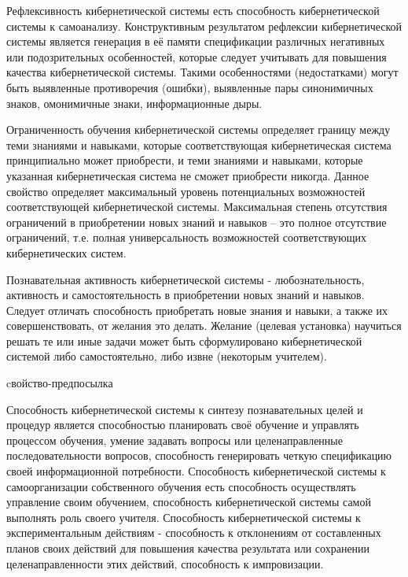 Рефлексивность кибернетической системы есть способность кибернетической системы к самоанализу.
Конструктивным результатом рефлексии кибернетической системы является генерация в её памяти спецификации различных негативных или подозрительных особенностей, которые следует учитывать для повышения качества кибернетической системы.
Такими особенностями (недостатками) могут быть выявленные противоречия (ошибки), выявленные пары синонимичных знаков, омонимичные знаки, информационные дыры.

Ограниченность обучения кибернетической системы определяет границу между теми знаниями и навыками, которые соответствующая кибернетическая система принципиально может приобрести, и теми знаниями и навыками, которые указанная кибернетическая система не сможет приобрести никогда.
Данное свойство определяет максимальный уровень потенциальных возможностей соответствующей кибернетической системы.
Максимальная степень отсутствия ограничений в приобретении новых знаний и навыков – это полное отсутствие ограничений, т.е. полная универсальность возможностей соответствующих кибернетических систем.

Познавательная активность кибернетической системы - любознательность, активность и самостоятельность в приобретении новых знаний и навыков.
Следует отличать способность приобретать новые знания и навыки, а также их совершенствовать, от желания это делать.
Желание (целевая установка) научиться решать те или иные задачи может быть сформулировано кибернетической системой либо самостоятельно, либо извне (некоторым учителем).

\begin{SCn}
\begin{scnrelfromlist}{cвойство-предпосылка}
\end{scnrelfromlist}
\end{SCn}

Способность кибернетической системы к синтезу познавательных целей и процедур является способностью планировать своё обучение и управлять процессом обучения, умение задавать вопросы или целенаправленные последовательности вопросов, способность генерировать четкую спецификацию своей информационной потребности.
Способность кибернетической системы к самоорганизации собственного обучения есть способность осуществлять управление своим обучением, способность кибернетической системы самой выполнять роль своего учителя.
Способность кибернетической системы к экспериментальным действиям - способность к отклонениям от составленных планов своих действий для повышения качества результата или сохранении целенаправленности этих действий, способность к импровизации.

